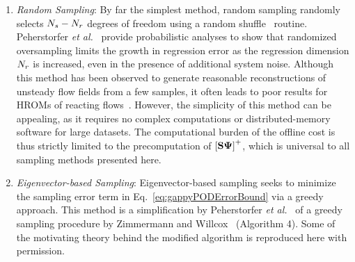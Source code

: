 \begin{enumerate}
	\item \textit{Random Sampling}: By far the simplest method, random sampling randomly selects $N_s - N_r$ degrees of freedom using a random shuffle \CC\ routine. Peherstorfer \textit{et al.}~\cite{Peherstorfer2020} provide probabilistic analyses to show that randomized oversampling limits the growth in regression error as the regression dimension $N_r$ is increased, even in the presence of additional system noise. Although this method has been observed to generate reasonable reconstructions of unsteady flow fields from a few samples, it often leads to poor results for HROMs of reacting flows~\cite{Wentland2021}. However, the simplicity of this method can be appealing, as it requires no complex computations or distributed-memory software for large datasets. The computational burden of the offline cost is thus strictly limited to the precomputation of $\left[\sampMat \deimBasis\right]^+$, which is universal to all sampling methods presented here.

	\item \textit{Eigenvector-based Sampling}: Eigenvector-based sampling seeks to minimize the sampling error term in Eq.~\ref{eq:gappyPODErrorBound} via a greedy approach. This method is a simplification by Peherstorfer \textit{et al.}~\cite{Peherstorfer2020} of a greedy sampling procedure by Zimmermann and Willcox~\cite{Zimmermann2016} (Algorithm 4). Some of the motivating theory behind the modified algorithm is reproduced here with permission.


\end{enumerate}
